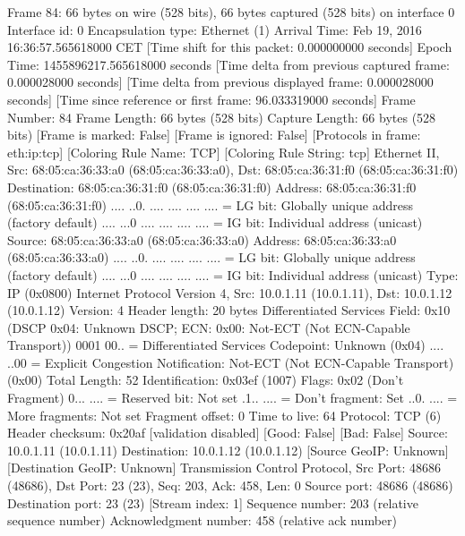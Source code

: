 Frame 84: 66 bytes on wire (528 bits), 66 bytes captured (528 bits) on interface 0
    Interface id: 0
    Encapsulation type: Ethernet (1)
    Arrival Time: Feb 19, 2016 16:36:57.565618000 CET
    [Time shift for this packet: 0.000000000 seconds]
    Epoch Time: 1455896217.565618000 seconds
    [Time delta from previous captured frame: 0.000028000 seconds]
    [Time delta from previous displayed frame: 0.000028000 seconds]
    [Time since reference or first frame: 96.033319000 seconds]
    Frame Number: 84
    Frame Length: 66 bytes (528 bits)
    Capture Length: 66 bytes (528 bits)
    [Frame is marked: False]
    [Frame is ignored: False]
    [Protocols in frame: eth:ip:tcp]
    [Coloring Rule Name: TCP]
    [Coloring Rule String: tcp]
Ethernet II, Src: 68:05:ca:36:33:a0 (68:05:ca:36:33:a0), Dst: 68:05:ca:36:31:f0 (68:05:ca:36:31:f0)
    Destination: 68:05:ca:36:31:f0 (68:05:ca:36:31:f0)
        Address: 68:05:ca:36:31:f0 (68:05:ca:36:31:f0)
        .... ..0. .... .... .... .... = LG bit: Globally unique address (factory default)
        .... ...0 .... .... .... .... = IG bit: Individual address (unicast)
    Source: 68:05:ca:36:33:a0 (68:05:ca:36:33:a0)
        Address: 68:05:ca:36:33:a0 (68:05:ca:36:33:a0)
        .... ..0. .... .... .... .... = LG bit: Globally unique address (factory default)
        .... ...0 .... .... .... .... = IG bit: Individual address (unicast)
    Type: IP (0x0800)
Internet Protocol Version 4, Src: 10.0.1.11 (10.0.1.11), Dst: 10.0.1.12 (10.0.1.12)
    Version: 4
    Header length: 20 bytes
    Differentiated Services Field: 0x10 (DSCP 0x04: Unknown DSCP; ECN: 0x00: Not-ECT (Not ECN-Capable Transport))
        0001 00.. = Differentiated Services Codepoint: Unknown (0x04)
        .... ..00 = Explicit Congestion Notification: Not-ECT (Not ECN-Capable Transport) (0x00)
    Total Length: 52
    Identification: 0x03ef (1007)
    Flags: 0x02 (Don't Fragment)
        0... .... = Reserved bit: Not set
        .1.. .... = Don't fragment: Set
        ..0. .... = More fragments: Not set
    Fragment offset: 0
    Time to live: 64
    Protocol: TCP (6)
    Header checksum: 0x20af [validation disabled]
        [Good: False]
        [Bad: False]
    Source: 10.0.1.11 (10.0.1.11)
    Destination: 10.0.1.12 (10.0.1.12)
    [Source GeoIP: Unknown]
    [Destination GeoIP: Unknown]
Transmission Control Protocol, Src Port: 48686 (48686), Dst Port: 23 (23), Seq: 203, Ack: 458, Len: 0
    Source port: 48686 (48686)
    Destination port: 23 (23)
    [Stream index: 1]
    Sequence number: 203    (relative sequence number)
    Acknowledgment number: 458    (relative ack number)
